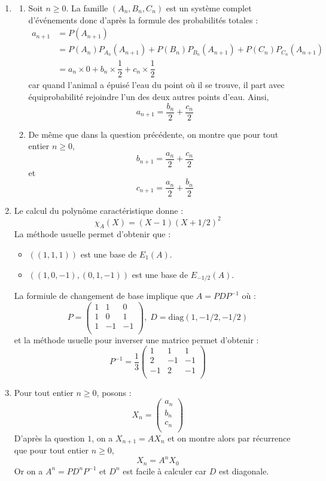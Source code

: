 \documentclass[a4paper,10pt]{report}
\begin{document}
\corr \begin{enumerate}

	\item 
	\begin{enumerate}
		\item Soit $n \geq 0$. La famille $(A_n,B_n,C_n)$ est un système complet d'événements donc d'après la formule des probabilités totales :
\begin{align*}
a_{n+1} & = P(A_{n+1}) \\
& = P(A_n) P_{A_n}(A_{n+1}) +P(B_n) P_{B_n}(A_{n+1}) +P(C_n) P_{C_n}(A_{n+1}) \\
& = a_n \times 0 + b_n \times \dfrac{1}{2} + c_n \times \dfrac{1}{2} 
\end{align*}
car quand l'animal a \'epuis\'e l'eau du point o\`u il se trouve, il part avec \'equiprobabilit\'e rejoindre l'un des deux autres points d'eau. Ainsi,
$$ a_{n+1} =  \dfrac{b_n}{2} + \dfrac{c_n}{2}$$
		\item De même que dans la question précédente, on montre que pour tout entier $n \geq 0$,
$$ b_{n+1} =  \dfrac{a_n}{2} + \dfrac{c_n}{2}$$
et 
$$ c_{n+1} =  \dfrac{a_n}{2} + \dfrac{b_n}{2}$$
	\end{enumerate}
	
	\item Le calcul du polynôme caractéristique donne :
	$$ \chi_A(X) = (X-1)(X+1/2)^2$$
La méthode usuelle permet d'obtenir que :
\begin{itemize}
\item $((1,1,1))$ est une base de $E_1(A)$.
\item $((1,0,-1),(0,1,-1))$ est une base de $E_{-1/2}(A)$.
\end{itemize}
La formiule de changement de base implique que $A=PDP^{-1}$ où :
$$ P = \begin{pmatrix}
1 & 1 & 0 \\
1 & 0 & 1 \\
1 & -1 & -1 \\
\end{pmatrix}, \; D= \textrm{diag}(1,-1/2,-1/2)$$
et la méthode usuelle pour inverser une matrice permet d'obtenir :
$$ P^{-1} = \dfrac{1}{3} \begin{pmatrix}
1 & 1 & 1 \\
2 & -1 & -1 \\
-1 & 2 & -1 \\
\end{pmatrix}$$
\item Pour tout entier $n \geq 0$, posons : 
$$ X_n = \begin{pmatrix}
a_n \\
b_n \\
c_n \\
\end{pmatrix}$$
D'après la question $1$, on a $X_{n+1}=A X_n$ et on montre alors par récurrence que pour tout entier $n \geq 0$,
$$ X_n = A^n X_0$$
Or on a $A^n=PD^n P^{-1}$ et $D^n$ est facile à calculer car $D$ est diagonale.
\end{enumerate}
\end{document}
